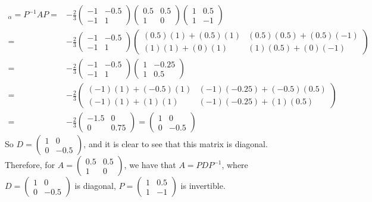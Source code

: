 \documentclass[12pt]{article}
\begin{document}
\begin{align*}
[T]_{\alpha} = P^{-1} A P =& -\frac{2}{3} \begin{pmatrix}-1&-0.5\\-1&1\end{pmatrix} \begin{pmatrix}0.5&0.5\\1&0\end{pmatrix} \begin{pmatrix}1&0.5\\1&-1\end{pmatrix} &\\
=& -\frac{2}{3} \begin{pmatrix}-1&-0.5\\-1&1\end{pmatrix} \begin{pmatrix}(0.5)(1)+(0.5)(1) & (0.5)(0.5)+(0.5)(-1)\\(1)(1)+(0)(1)&(1)(0.5)+(0)(-1)\end{pmatrix} &\\
=&-\frac{2}{3} \begin{pmatrix}-1&-0.5\\-1&1\end{pmatrix} \begin{pmatrix}1&-0.25\\1&0.5\end{pmatrix} &\\
=&-\frac{2}{3}\begin{pmatrix}(-1)(1)+(-0.5)(1) & (-1)(-0.25)+(-0.5)(0.5)\\(-1)(1)+(1)(1)&(-1)(-0.25)+(1)(0.5)\end{pmatrix} &\\
=&-\frac{2}{3}\begin{pmatrix}-1.5&0\\0&0.75\end{pmatrix} = \begin{pmatrix}1&0\\0&-0.5\end{pmatrix}&
\end{align*}
So $D=\begin{pmatrix}1&0\\0&-0.5\end{pmatrix}$, and it is clear to see that this matrix is diagonal. Therefore, for $A=\begin{pmatrix}0.5&0.5\\1&0\end{pmatrix}$, we have that $A=P D P^{-1}$, where $D=\begin{pmatrix}1&0\\0&-0.5\end{pmatrix}$ is diagonal, $P=\begin{pmatrix}1&0.5\\1&-1\end{pmatrix}$ is invertible.
\end{document}
